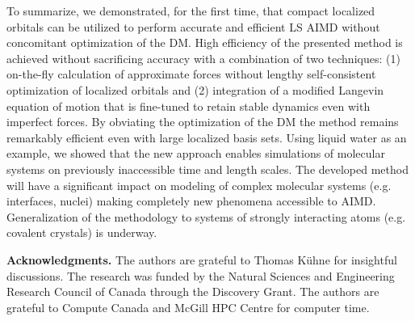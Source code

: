 \documentclass[aps,prl,reprint,amsmath,amssymb]{revtex4-1}
\begin{document}
To summarize, we demonstrated, for the first time, that compact localized orbitals can be utilized to perform accurate and efficient LS AIMD without concomitant optimization of the DM. %
High efficiency of the presented method is achieved without sacrificing accuracy with a combination of two techniques: (1) on-the-fly calculation of approximate forces without lengthy self-consistent optimization of localized orbitals and (2) integration of a modified Langevin equation of motion that is fine-tuned to retain stable dynamics even with imperfect forces. 
By obviating the optimization of the DM the method remains remarkably efficient even with large localized basis sets. 
Using liquid water as an example, we showed that the new approach enables simulations of molecular systems on previously inaccessible time and length scales. 
The developed method will have a significant impact on modeling of complex molecular systems (e.g. interfaces, nuclei) making completely new phenomena accessible to AIMD. 
Generalization of the methodology to systems of strongly interacting atoms (e.g. covalent crystals) is underway.

\textbf{Acknowledgments.} The authors are grateful to Thomas K\"uhne for insightful discussions. The research was funded by the Natural Sciences and Engineering Research Council of Canada through the Discovery Grant. The authors are grateful to Compute Canada and McGill HPC Centre for computer time.




\else

%
\end{document}
